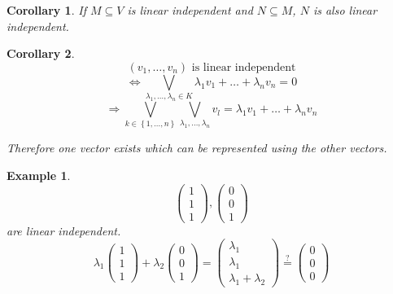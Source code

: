 \documentclass[a4paper,landscape,twocolumn]{article}
\newcommand\set[1]{\left\{#1\right\}}
\newtheorem{ex}{Example}
\newtheorem{cor}{Corollary}
\begin{document}
\begin{cor}
  If $M \subseteq V$ is linear independent and $N \subseteq M$,
  $N$ is also linear independent.
\end{cor}

\begin{cor}
  \[ (v_1, \ldots, v_n) \text{ is linear independent} \]
  \[ \Leftrightarrow \bigvee_{\lambda_1, \ldots, \lambda_n \in K} \lambda_1 v_1 + \ldots + \lambda_n v_n = 0 \]
  \[ \Rightarrow \bigvee_{k \in \set{1, \ldots, n}} \bigvee_{\lambda_1, \ldots, \lambda_n} v_l = \lambda_1 v_1 + \ldots + \lambda_n v_n \]

  Therefore one vector exists which can be represented using the other vectors.
\end{cor}

\begin{ex}
  \[ \begin{pmatrix} 1 \\ 1 \\ 1 \end{pmatrix}, \begin{pmatrix} 0 \\ 0 \\ 1 \end{pmatrix} \]
  are linear independent.
  \[ \lambda_1 \begin{pmatrix} 1 \\ 1 \\ 1 \end{pmatrix} + \lambda_2 \begin{pmatrix} 0 \\ 0 \\ 1 \end{pmatrix} = \begin{pmatrix} \lambda_1 \\ \lambda_1 \\ \lambda_1 + \lambda_2 \end{pmatrix} \stackrel?= \begin{pmatrix} 0 \\ 0 \\ 0 \end{pmatrix} \]
\end{ex}
\end{document}
